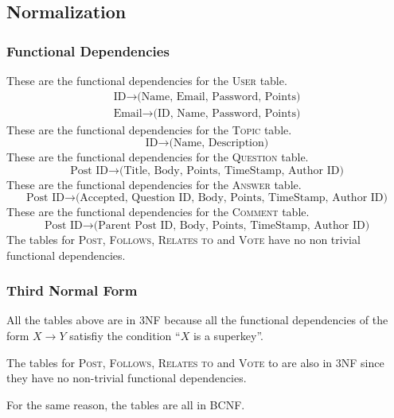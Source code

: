 \subsection{Normalization}
\subsubsection{Functional Dependencies}
These are the functional dependencies for the \textsc{User} table.
\begin{gather*}
	\text{ID} \to \text{(Name, Email, Password, Points)} \\
	\text{Email} \to \text{(ID, Name, Password, Points)}
\end{gather*}
These are the functional dependencies for the \textsc{Topic} table.
\[\text{ID} \to \text{(Name, Description)}\]
These are the functional dependencies for the \textsc{Question} table.
\[\text{Post ID} \to \text{(Title, Body, Points, TimeStamp, Author ID)}\]
These are the functional dependencies for the \textsc{Answer} table.
\[\text{Post ID} \to \text{(Accepted, Question ID, Body, Points, TimeStamp, Author ID)}\]
These are the functional dependencies for the \textsc{Comment} table.
\[\text{Post ID} \to \text{(Parent Post ID, Body, Points, TimeStamp, Author ID)}\]
The tables for \textsc{Post}, \textsc{Follows}, \textsc{Relates to} and \textsc{Vote} have no non trivial functional dependencies.


\subsubsection{Third Normal Form}
All the tables above are in 3NF because all the functional dependencies of the form \(X \to Y\) satisfiy the condition ``\(X\) is a superkey''.

The tables for \textsc{Post}, \textsc{Follows}, \textsc{Relates to} and \textsc{Vote} to are also in 3NF since they have no non-trivial functional dependencies.

For the same reason, the tables are all in BCNF.